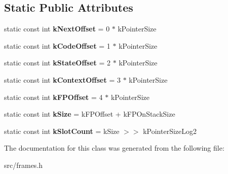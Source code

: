 \subsection*{Static Public Attributes}
\begin{DoxyCompactItemize}
\item 
\hypertarget{classv8_1_1internal_1_1_stack_handler_constants_a705ae64dfed67338f0275c70e02cc458}{}static const int {\bfseries k\+Next\+Offset} = 0 $\ast$ k\+Pointer\+Size\label{classv8_1_1internal_1_1_stack_handler_constants_a705ae64dfed67338f0275c70e02cc458}

\item 
\hypertarget{classv8_1_1internal_1_1_stack_handler_constants_a353a9d2f5ed443e6de0761539fcb676e}{}static const int {\bfseries k\+Code\+Offset} = 1 $\ast$ k\+Pointer\+Size\label{classv8_1_1internal_1_1_stack_handler_constants_a353a9d2f5ed443e6de0761539fcb676e}

\item 
\hypertarget{classv8_1_1internal_1_1_stack_handler_constants_af4f768aeb5d2c22eadc006970f3aa56b}{}static const int {\bfseries k\+State\+Offset} = 2 $\ast$ k\+Pointer\+Size\label{classv8_1_1internal_1_1_stack_handler_constants_af4f768aeb5d2c22eadc006970f3aa56b}

\item 
\hypertarget{classv8_1_1internal_1_1_stack_handler_constants_a66212b27c01ac01c99cc124e882de910}{}static const int {\bfseries k\+Context\+Offset} = 3 $\ast$ k\+Pointer\+Size\label{classv8_1_1internal_1_1_stack_handler_constants_a66212b27c01ac01c99cc124e882de910}

\item 
\hypertarget{classv8_1_1internal_1_1_stack_handler_constants_a1de6aec92e8dd47cf41af802507df08d}{}static const int {\bfseries k\+F\+P\+Offset} = 4 $\ast$ k\+Pointer\+Size\label{classv8_1_1internal_1_1_stack_handler_constants_a1de6aec92e8dd47cf41af802507df08d}

\item 
\hypertarget{classv8_1_1internal_1_1_stack_handler_constants_abf599d4b8b409672c9e68875be6fd35e}{}static const int {\bfseries k\+Size} = k\+F\+P\+Offset + k\+F\+P\+On\+Stack\+Size\label{classv8_1_1internal_1_1_stack_handler_constants_abf599d4b8b409672c9e68875be6fd35e}

\item 
\hypertarget{classv8_1_1internal_1_1_stack_handler_constants_aac64362c6b9a4e36fa0b39217b2185b9}{}static const int {\bfseries k\+Slot\+Count} = k\+Size $>$$>$ k\+Pointer\+Size\+Log2\label{classv8_1_1internal_1_1_stack_handler_constants_aac64362c6b9a4e36fa0b39217b2185b9}

\end{DoxyCompactItemize}


The documentation for this class was generated from the following file\+:\begin{DoxyCompactItemize}
\item 
src/frames.\+h\end{DoxyCompactItemize}
